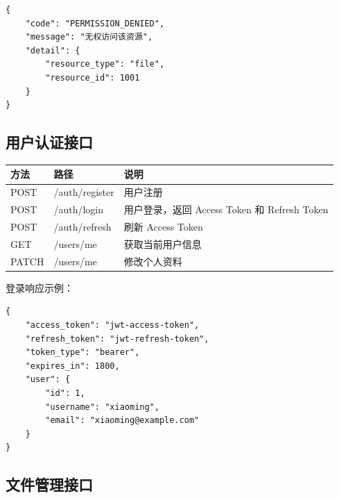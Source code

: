 \documentclass[a4paper,zihao=-4]{ctexart}
\begin{document}
\begin{lstlisting}
{
    "code": "PERMISSION_DENIED",
    "message": "无权访问该资源",
    "detail": {
        "resource_type": "file",
        "resource_id": 1001
    }
}
\end{lstlisting}

\hypertarget{ux7528ux6237ux8ba4ux8bc1ux63a5ux53e3}{%
\subsection{用户认证接口}\label{ux7528ux6237ux8ba4ux8bc1ux63a5ux53e3}}

\begin{longtable}{|>{\raggedright\arraybackslash}p{2.4cm}|>{\raggedright\arraybackslash}p{\dimexpr(\linewidth-2.4cm-6\tabcolsep-4\arrayrulewidth)/2\relax}|>{\raggedright\arraybackslash}p{\dimexpr(\linewidth-2.4cm-6\tabcolsep-4\arrayrulewidth)/2\relax}|}
\hline
方法 & 路径 & 说明\tabularnewline
\hline
\endhead
POST & /auth/register & 用户注册\tabularnewline
\hline
POST & /auth/login & 用户登录，返回 Access Token 和 Refresh Token\tabularnewline
\hline
POST & /auth/refresh & 刷新 Access Token\tabularnewline
\hline
GET & /users/me & 获取当前用户信息\tabularnewline
\hline
PATCH & /users/me & 修改个人资料\tabularnewline
\hline
\end{longtable}

登录响应示例：

\begin{lstlisting}
{
    "access_token": "jwt-access-token",
    "refresh_token": "jwt-refresh-token",
    "token_type": "bearer",
    "expires_in": 1800,
    "user": {
        "id": 1,
        "username": "xiaoming",
        "email": "xiaoming@example.com"
    }
}
\end{lstlisting}

\hypertarget{ux6587ux4ef6ux7ba1ux7406ux63a5ux53e3}{%
\subsection{文件管理接口}\label{ux6587ux4ef6ux7ba1ux7406ux63a5ux53e3}}
\end{document}

